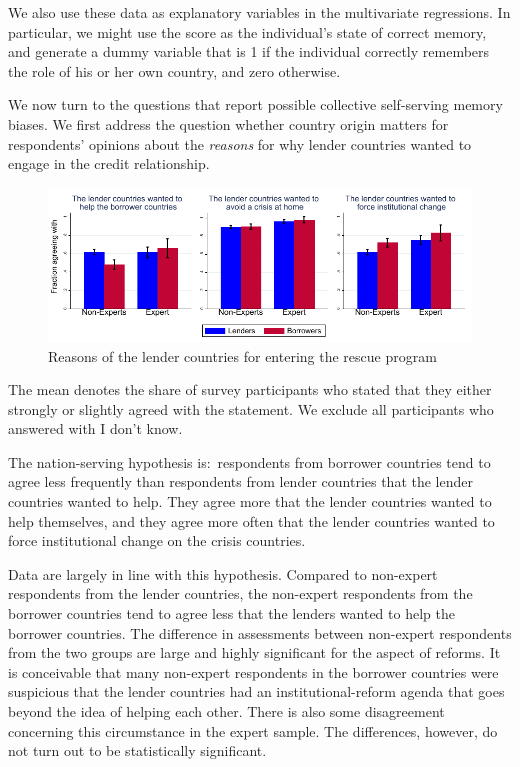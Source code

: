 We also use these data as explanatory variables in the multivariate
regressions. In particular, we might use the score as the
individual's state of correct memory, and generate a dummy variable that is
1 if the individual correctly remembers the role of his or her own country,
and zero otherwise. 

We now turn to the questions that report possible collective
self-serving memory biases. We first address the question whether country
origin matters for respondents' opinions about the \textit{reasons} for why lender countries wanted to engage in the credit relationship. 
\begin{figure}[h!]
\caption{Reasons of the lender countries for entering the rescue program}
    \centering
    \includegraphics[scale=1.2]{graph2.pdf}
  
    \label{fig:my_label}
\end{figure}

The mean denotes the share of survey participants who stated that they either strongly or slightly agreed with the statement. We exclude all participants who answered with I don't know.  

The nation-serving hypothesis is:\ respondents from borrower countries tend
to agree less frequently than respondents from lender countries 
that the lender countries wanted to help. They agree more that
the lender countries wanted to help themselves, and they agree more 
often that the lender countries wanted to force institutional change on the
crisis countries.\textit{\ }

Data are largely in line with this hypothesis. Compared to
non-expert respondents from the lender countries, the non-expert respondents
from the borrower countries tend to agree less that the
lenders wanted to help the borrower countries. 
The difference in assessments between
non-expert respondents from the two groups are large and highly
significant for the aspect of reforms. It is conceivable that
many non-expert respondents in the borrower countries were suspicious that
the lender countries had an institutional-reform agenda that goes beyond the
idea of helping each other. There is also some disagreement concerning
this circumstance in the expert sample. The differences, however, do not turn out to be statistically significant. 



